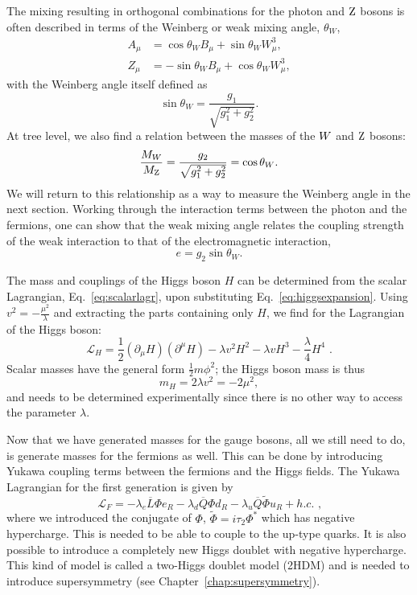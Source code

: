 The mixing resulting in orthogonal combinations for the photon and $\mathrm{Z}$ bosons is often described
in terms of the Weinberg or weak mixing angle, $\theta_W$,
\begin{align}
  A_\mu &=  \cos \theta_W B_\mu + \sin \theta_W W_\mu^3,\\
  Z_\mu &=  - \sin \theta_W B_\mu + \cos \theta_W W_\mu^3, 
\end{align}
with the Weinberg angle itself defined as
\begin{equation}
  \sin \theta_W = \frac{g_1}{\sqrt{g_1^2 + g_2^2}} .
\end{equation}
At tree level, we also find a relation between the masses of the $W$ and $\mathrm{Z}$ bosons: 
\begin{equation}
  \frac{M_{W}}{M_{\mathrm{Z}}} = \frac{g_2}{\sqrt{g_1^2 + g_2^2}} = \cos \theta_W . 
\end{equation}
We will return to this relationship as a way to measure the Weinberg angle in the next section.
Working through the interaction terms between the photon and the fermions, one can show that the
weak mixing angle relates the coupling strength of the weak interaction to that of the
electromagnetic interaction, 
\begin{equation}
  e = g_2 \sin \theta_W .
\end{equation}

The mass and
couplings of the Higgs boson $H$ can be determined from the scalar Lagrangian,
Eq.~\ref{eq:scalarlagr}, upon substituting Eq.~\ref{eq:higgsexpansion}. 
Using $v^2 = -\frac{\mu^2}{\lambda}$ and extracting the parts containing only $H$, we find for the
Lagrangian of the Higgs boson:
\begin{equation}
  \mathcal{L}_H = \frac{1}{2} (\partial_\mu H)(\partial^\mu H) - \lambda v^2 H^2 - \lambda v H^3 -
\frac{\lambda}{4} H^4 \textrm{ .}
\end{equation}
Scalar masses have the general form $\frac{1}{2} m \phi^2$; the Higgs boson mass is thus
\begin{equation}
m_H =  2 \lambda v^2 = - 2 \mu^2,
\end{equation}
and needs to be determined experimentally since there is no other way to access the parameter
$\lambda$. 

Now that we have generated masses for the gauge bosons, all we still need to do, is
generate masses for the fermions as well. This can be done by introducing Yukawa coupling terms
between the fermions and the Higgs fields. 
The Yukawa Lagrangian for the first generation is given by
\begin{equation}
  \mathcal{L}_F = - \lambda_e \overline{L} \Phi e_R - \lambda_d \overline{Q} \Phi d_R - \lambda_u
\overline{Q} \widetilde{\Phi} u_R + h.c. \textrm{ ,}
  \label{eq:Lag_Yuk}
\end{equation}
where we introduced the conjugate of $\Phi$, $\widetilde{\Phi} = i \tau_2 \Phi^*$ which has negative
hypercharge. This is needed to be able to couple to the up-type quarks. It is also possible to
introduce a completely new Higgs doublet with negative hypercharge. This kind of model is called a
two-Higgs doublet model (2HDM) and is needed to introduce supersymmetry (see
Chapter~\ref{chap:supersymmetry}). 

